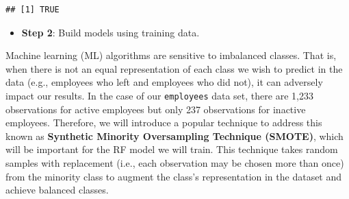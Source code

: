 \documentclass[
]{book}
\newenvironment{Shaded}{\begin{snugshade}}{\end{snugshade}}
\newcommand{\AttributeTok}[1]{\textcolor[rgb]{0.77,0.63,0.00}{#1}}
\newcommand{\CommentTok}[1]{\textcolor[rgb]{0.56,0.35,0.01}{\textit{#1}}}
\newcommand{\ConstantTok}[1]{\textcolor[rgb]{0.00,0.00,0.00}{#1}}
\newcommand{\DecValTok}[1]{\textcolor[rgb]{0.00,0.00,0.81}{#1}}
\newcommand{\FunctionTok}[1]{\textcolor[rgb]{0.00,0.00,0.00}{#1}}
\newcommand{\NormalTok}[1]{#1}
\newcommand{\OtherTok}[1]{\textcolor[rgb]{0.56,0.35,0.01}{#1}}
\newcommand{\SpecialCharTok}[1]{\textcolor[rgb]{0.00,0.00,0.00}{#1}}
\providecommand{\tightlist}{%
  \setlength{\itemsep}{0pt}\setlength{\parskip}{0pt}}
\begin{document}
\begin{Shaded}
\end{Shaded}

\begin{verbatim}
## [1] TRUE
\end{verbatim}

\begin{itemize}
\tightlist
\item
  \textbf{Step 2}: Build models using training data.
\end{itemize}

Machine learning (ML) algorithms are sensitive to imbalanced classes. That is, when there is not an equal representation of each class we wish to predict in the data (e.g., employees who left and employees who did not), it can adversely impact our results. In the case of our \texttt{employees} data set, there are 1,233 observations for active employees but only 237 observations for inactive employees. Therefore, we will introduce a popular technique to address this known as \textbf{Synthetic Minority Oversampling Technique (SMOTE)}, which will be important for the RF model we will train. This technique takes random samples with replacement (i.e., each observation may be chosen more than once) from the minority class to augment the class's representation in the dataset and achieve balanced classes.
\end{document}
